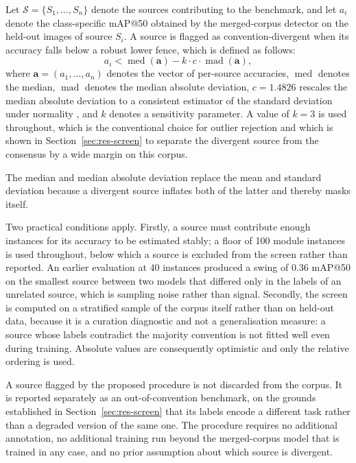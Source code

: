 Let $\mathcal{S}=\{S_1,\dots,S_n\}$ denote the sources contributing to the
benchmark, and let $a_i$ denote the class-specific mAP@50 obtained by the
merged-corpus detector on the held-out images of source $S_i$. A source is
flagged as convention-divergent when its accuracy falls below a robust lower
fence, which is defined as follows:
\begin{equation}
a_i < \operatorname{med}(\mathbf{a}) - k \cdot c \cdot \operatorname{mad}(\mathbf{a}),
\label{eq:screen}
\end{equation}
where $\mathbf{a}=(a_1,\dots,a_n)$ denotes the vector of per-source accuracies,
$\operatorname{med}$ denotes the median, $\operatorname{mad}$ denotes the median
absolute deviation, $c=1.4826$ rescales the median absolute deviation to a
consistent estimator of the standard deviation under normality
\cite{rousseeuw1993mad}, and $k$ denotes a sensitivity parameter. A value of
$k=3$ is used throughout, which is the conventional choice for outlier rejection
and which is shown in Section~\ref{sec:res-screen} to separate the divergent
source from the consensus by a wide margin on this corpus.

The median and median absolute deviation replace the mean and standard deviation
because a divergent source inflates both of the latter and thereby masks itself.

Two practical conditions apply. Firstly, a source must contribute enough instances
for its accuracy to be estimated stably; a floor of 100 module instances is used
throughout, below which a source is excluded from the screen rather than reported. An
earlier evaluation at 40 instances produced a swing of 0.36 mAP@50 on the smallest
source between two models that differed only in the labels of an unrelated source,
which is sampling noise rather than signal. Secondly, the screen is computed on a
stratified sample of the corpus itself rather than on held-out data, because it is a
curation diagnostic and not a generalisation measure: a source whose labels
contradict the majority convention is not fitted well even during training. Absolute
values are consequently optimistic and only the relative ordering is used.

A source flagged by the proposed procedure is not discarded from the corpus. It
is reported separately as an out-of-convention benchmark, on the grounds
established in Section~\ref{sec:res-screen} that its labels encode a different
task rather than a degraded version of the same one. The procedure requires no
additional annotation, no additional training run beyond the merged-corpus model
that is trained in any case, and no prior assumption about which source is
divergent.

